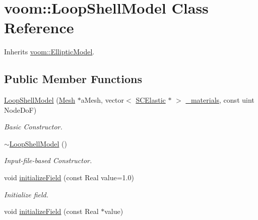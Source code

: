 \hypertarget{classvoom_1_1_loop_shell_model}{
\section{voom::LoopShellModel Class Reference}
\label{classvoom_1_1_loop_shell_model}
}


Inherits \hyperlink{classvoom_1_1_elliptic_model}{voom::EllipticModel}.\subsection*{Public Member Functions}
\begin{DoxyCompactItemize}
\item 
\hyperlink{classvoom_1_1_loop_shell_model_ae66f6b807e3e3826b36cfdd12f8ba527}{LoopShellModel} (\hyperlink{classvoom_1_1_mesh}{Mesh} $\ast$aMesh, vector$<$ \hyperlink{classvoom_1_1_s_c_elastic}{SCElastic} $\ast$ $>$ \hyperlink{classvoom_1_1_loop_shell_model_a7bfa9ffa46a7825653c120c0c8d68e4d}{\_\-materials}, const uint NodeDoF)
\begin{DoxyCompactList}\small\item\em Basic Constructor. \item\end{DoxyCompactList}\item 
\hyperlink{classvoom_1_1_loop_shell_model_a15cc107dc37248847613f260b427bb4f}{$\sim$LoopShellModel} ()
\begin{DoxyCompactList}\small\item\em Input-\/file-\/based Constructor. \item\end{DoxyCompactList}\item 
\hypertarget{classvoom_1_1_loop_shell_model_a20b4efb64d58ba9b151ea6cb3b5f4228}{
void \hyperlink{classvoom_1_1_loop_shell_model_a20b4efb64d58ba9b151ea6cb3b5f4228}{initializeField} (const Real value=1.0)}
\label{classvoom_1_1_loop_shell_model_a20b4efb64d58ba9b151ea6cb3b5f4228}

\begin{DoxyCompactList}\small\item\em Initialize field. \item\end{DoxyCompactList}\item 
\hypertarget{classvoom_1_1_loop_shell_model_aff6431e34fa83433af3e7ccbb356d8c5}{
void \hyperlink{classvoom_1_1_loop_shell_model_aff6431e34fa83433af3e7ccbb356d8c5}{initializeField} (const Real $\ast$value)}
\label{classvoom_1_1_loop_shell_model_aff6431e34fa83433af3e7ccbb356d8c5}


\end{DoxyCompactItemize}
